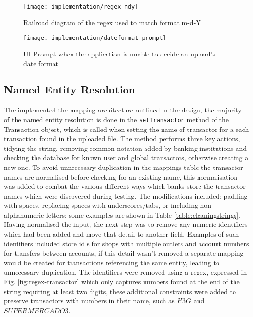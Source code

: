\begin{figure}[h]
    \centering
    \texttt{[image: implementation/regex-mdy]}
    \caption[Regular expression used to match m-d-Y]{Railroad diagram of the regex used to match format m-d-Y}
    \label{fig:regex-mdy}
\end{figure}

\begin{figure}[h]
    \centering
    \texttt{[image: implementation/dateformat-prompt]}
    \caption{UI Prompt when the application is unable to decide an upload's date format}
    \label{fig:dateformat-prompt}
\end{figure}

\subsection{Named Entity Resolution}
The implemented the mapping architecture outlined in the design, the majority of the named entity resolution is done in the \lstinline{setTransactor} method of the Transaction object, which is called when setting the name of transactor for a each transaction found in the uploaded file.   
% 
The method performs three key actions, tidying the string, removing common notation added by banking institutions and checking the database for known user and global transactors, otherwise creating a new one.
% 
To avoid unnecessary duplication in the mappings table the \gls{transactor} names are normalised before checking for an existing name, this normalisation was added to combat the various different ways which banks store the transactor names which were discovered during testing. The modifications included: padding with spaces, replacing spaces with underscores/tabs, or including non alphanumeric letters; some examples are shown in Table \ref{table:cleaningstrings}.
%
Having normalised the input, the next step was to remove any numeric identifiers which had been added and move that detail to another field. Examples of such identifiers included store id's for shops with multiple outlets and account numbers for transfers between accounts, if this detail wasn't removed a separate mapping would be created for transactions referencing the same entity, leading to unnecessary duplication. The identifiers were removed using a regex, expressed in Fig. \ref{fig:regex-transactor} which only captures numbers found at the end of the string requiring at least two digits, these additional constraints were added to preserve \glspl{transactor} with numbers in their name, such as \inlinetext$H3G$ and \inlinetext$SUPERMERCADO 3$.
